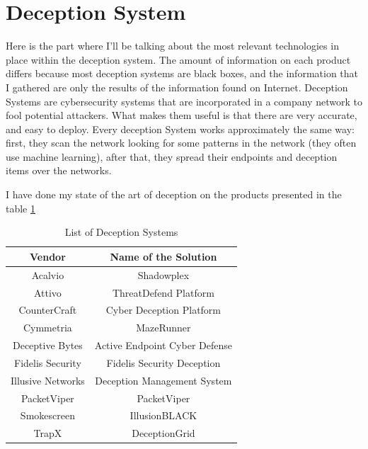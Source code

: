 \documentclass{tnreport}
\begin{document}
\section{Deception System}
Here is the part where I'll be talking about the most relevant technologies in place within the deception system.
The amount of information on each product differs because most deception systems are black boxes, and the information that I gathered are only the results of the information found on Internet. 
Deception Systems are cybersecurity systems that are incorporated in a company network to fool potential attackers. What makes them useful is that there are very accurate, and easy to deploy.
Every deception System works approximately the same way: first, they scan the network looking for some patterns in the network (they often use machine learning), after that, they spread their endpoints and deception items over the networks.

I have done my state of the art of deception on the products presented in the table \ref{tab:search}

\begin{table}
	\centering
	\begin{tabular}{|c|c|}
		\hline
		\textbf{Vendor}  & \textbf{Name of the Solution}                  
		\\
		\hline
		Acalvio            & Shadowplex\cite{lib4}
		\\
		\hline
		Attivo             & ThreatDefend Platform\cite{lib2}
		\\
		\hline
		CounterCraft       & Cyber Deception Platform\cite{lib}
		\\
		\hline
		Cymmetria          & MazeRunner\cite{lib5}
		\\
		\hline
		Deceptive Bytes    & Active Endpoint Cyber Defense
		\\
		\hline
		Fidelis Security              & Fidelis Security Deception                                                            
		\\
		\hline
		Illusive Networks  & Deception Management System                              
		\\
		\hline
		PacketViper        & PacketViper                             
		\\
		\hline
		Smokescreen        & IllusionBLACK                               
		\\
		\hline
		TrapX              & DeceptionGrid                              
		\\
		\hline
	\end{tabular}
	\caption{List of Deception Systems}
	\label{tab:search}
\end{table} 
 
\end{document}
